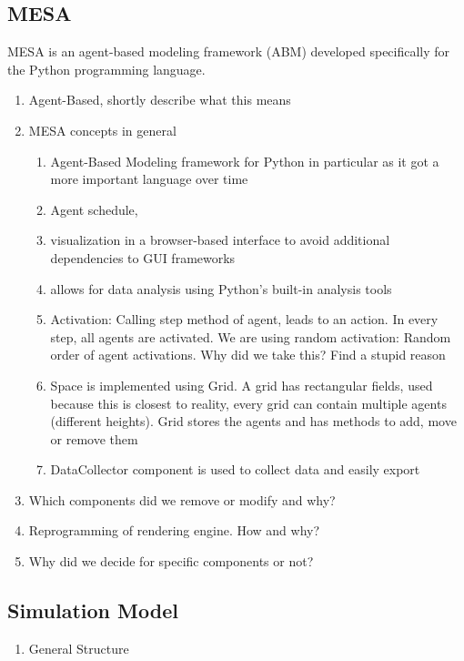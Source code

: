 \subsection{MESA}
MESA \cite{masad.2015} is an agent-based modeling framework (ABM) developed specifically for the Python programming language. 
\begin{enumerate}
	\item Agent-Based, shortly describe what this means
	\item MESA concepts in general \cite{masad.2015}
	\begin{enumerate}
		\item Agent-Based Modeling framework for Python in particular as it got a more important language over time
		\item Agent schedule, 
		\item visualization in a browser-based interface to avoid additional dependencies to GUI frameworks
		\item allows for data analysis using Python's built-in analysis tools
		\item Activation: Calling step method of agent, leads to an action. In every step, all agents are activated. We are using random activation: Random order of agent activations. Why did we take this? Find a stupid reason
		\item Space is implemented using Grid. A grid has rectangular fields, used because this is closest to reality, every grid can contain multiple agents (different heights). Grid stores the agents and has methods to add, move or remove them
		\item DataCollector component is used to collect data and easily export 
		
	\end{enumerate}
	\item Which components did we remove or modify and why?
	\item Reprogramming of rendering engine. How and why?
	
	\item Why did we decide for specific components or not?
\end{enumerate}
\subsection{Simulation Model}
\begin{enumerate}
	
	\item General Structure 
	
\end{enumerate}
